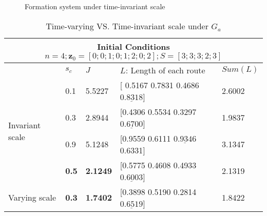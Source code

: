 \documentclass[times]{rncauth}
\begin{document}
\begin{figure}
\caption{Formation system under time-invariant
scale}\label{fig:time_invariant}
\end{figure}
\begin{table}
  \caption{Time-varying VS. Time-invariant scale under $G_a$}\label{table:invar}
  \begin{center}
\newsavebox{\tablebox}
\begin{lrbox}{\tablebox}
\begin{tabular}{|l|l|l|l|l|}
\hline
\multicolumn{5}{|c|}{Initial Conditions   $n=4; \mathbf{z}_0=[0;0;1;0;1;2;0;2]; S=[3;3;3;2;3]$} \\
\hline
 &$s_c$  & $J$  &  $L$: Length of each route & $Sum(L)$\\
\hline
\multirow{4}{*}{Invariant scale} &0.1 &5.5227 & [ 0.5167    0.7831    0.4686    $\underline{0.8318}$]&  2.6002\\
 &0.3 & 2.8944 & [0.4306  0.5534  0.3297  $\underline{0.6700}$] &   1.9837\\
 &0.9 & 5.1248 &[0.9559    0.6111    $\underline{0.9346}$    0.6331]& 3.1347\\
 &\textbf{\textbf{0.5 }} &  \textbf{2.1249 } &[0.5775  0.4608  0.4933  $\underline{0.6003}$] &2.1319\\
 \hline
Varying scale
 &\textbf{0.3}&\textbf{1.7402} & [0.3898 0.5190 0.2814 $\underline{0.6519}$] & 1.8422\\
\hline
\end{tabular}
\end{lrbox}
\scalebox{0.7}{\usebox{\tablebox}}
\end{center}
\end{table}
\end{document}
